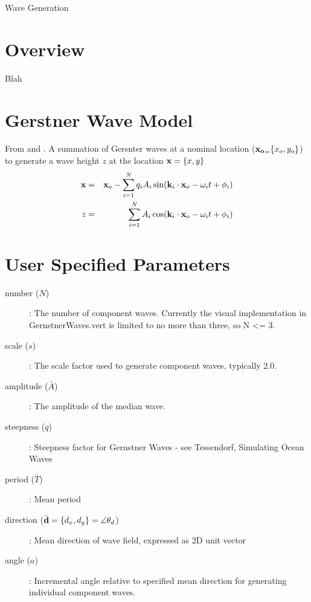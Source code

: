 \documentclass[11pt]{article}
\newcommand{\doctitle}{Wave Generation}
\begin{document}
  

\newpage
\setcounter{page}{1}
\begin{center}
{\huge \doctitle}
\end{center}


\section{Overview}
Blah

\section{Gerstner Wave Model}

From \cite{tessendorf99simulating} and \cite{gpugems_waves}.  A summation of Gersnter waves at a nominal location ($\mbox{${\bf x_o}_{=}$} \{x_o, y_o\}$) to generate a wave height $z$ at the location $\mbox{${\bf x}$} = \{x, y\}$
\begin{eqnarray}
  \mbox{${\bf x}$} & = & \mbox{${\bf x}_{o}$} - \sum_{i=1}^{N} q_i A_i \sin(\mbox{${\bf k}_{i}$} \cdot \mbox{${\bf x}_{o}$} - \omega_i t + \phi_i) \\
  z & = & \sum_{i=1}^N A_i \cos(\mbox{${\bf k}_{i}$} \cdot \mbox{${\bf x}_{o}$} - \omega_i t + \phi_i)
\end{eqnarray}

\section{User Specified Parameters}

\begin{description}
  \item[number ($N$)]: The number of component waves.  Currently the visual implementation in GernstnerWaves.vert is limited to no more than three, so N <= 3.
  \item[scale ($s$)]: The scale factor used to generate component waves, typically 2.0.
  \item[amplitude ($\bar{A}$)]: The amplitude of the median wave.
  \item[steepness ($q$)]: Steepness factor for Gernstner Waves - see Tessendorf, Simulating Ocean Waves
  \item[period ($\bar{T}$)]: Mean period
  \item[direction ($\bar{\mbox{${\bf d}$}}=\{d_x,d_y\}=\angle{\theta_d}$)]: Mean direction of wave field, expressed as 2D unit vector
  \item[angle ($a$)]: Incremental angle relative to specified mean direction for generating individual component waves.
\end{description}
\end{document}
